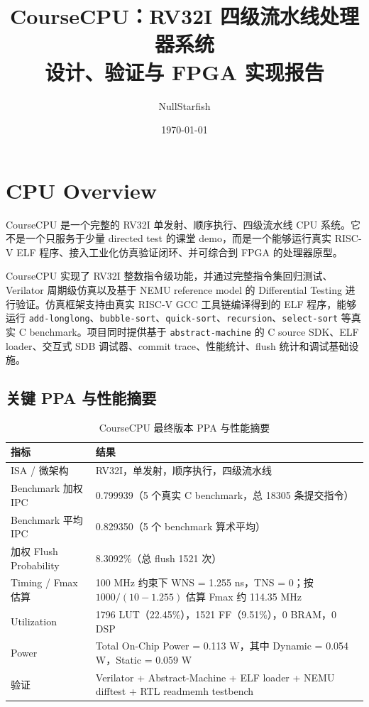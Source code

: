 \documentclass[UTF8,a4paper,12pt]{ctexrep}
\title{\textbf{CourseCPU：RV32I 四级流水线处理器系统}\\
\large 设计、验证与 FPGA 实现报告}
\author{NullStarfish}
\date{\today}
\begin{document}
\maketitle
\tableofcontents

\chapter{CPU Overview}

CourseCPU 是一个完整的 RV32I 单发射、顺序执行、四级流水线 CPU 系统。它不是一个只服务于少量 directed test 的课堂 demo，而是一个能够运行真实 RISC-V ELF 程序、接入工业化仿真验证闭环、并可综合到 FPGA 的处理器原型。

CourseCPU 实现了 RV32I 整数指令级功能，并通过完整指令集回归测试、Verilator 周期级仿真以及基于 NEMU reference model 的 Differential Testing 进行验证。仿真框架支持由真实 RISC-V GCC 工具链编译得到的 ELF 程序，能够运行 \texttt{add-longlong}、\texttt{bubble-sort}、\texttt{quick-sort}、\texttt{recursion}、\texttt{select-sort} 等真实 C benchmark。项目同时提供基于 \texttt{abstract-machine} 的 C source SDK、ELF loader、交互式 SDB 调试器、commit trace、性能统计、flush 统计和调试基础设施。

\section{关键 PPA 与性能摘要}

\begin{table}[H]
  \centering
  \caption{CourseCPU 最终版本 PPA 与性能摘要}
  \begin{tabularx}{\textwidth}{lX}
    \toprule
    指标 & 结果 \\
    \midrule
    ISA / 微架构 & RV32I，单发射，顺序执行，四级流水线 \\
    Benchmark 加权 IPC & 0.799939（5 个真实 C benchmark，总 18305 条提交指令） \\
    Benchmark 平均 IPC & 0.829350（5 个 benchmark 算术平均） \\
    加权 Flush Probability & 8.3092\%（总 flush 1521 次） \\
    Timing / Fmax 估算 & 100 MHz 约束下 WNS = 1.255 ns，TNS = 0；按 $1000/(10-1.255)$ 估算 Fmax 约 114.35 MHz \\
    Utilization & 1796 LUT（22.45\%），1521 FF（9.51\%），0 BRAM，0 DSP \\
    Power & Total On-Chip Power = 0.113 W，其中 Dynamic = 0.054 W，Static = 0.059 W \\
    验证 & Verilator + Abstract-Machine + ELF loader + NEMU difftest + RTL readmemh testbench \\
    \bottomrule
  \end{tabularx}
\end{table}
\end{document}
